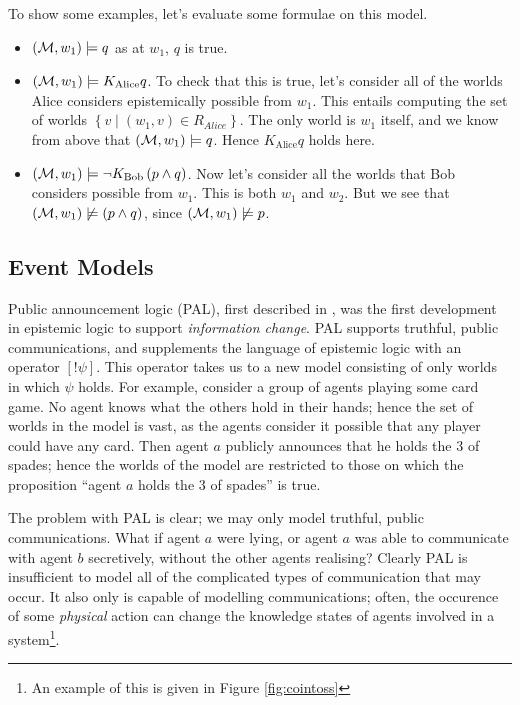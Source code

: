 \documentclass[10pt, a4paper]{report}
\begin{document}
To show some examples, let's evaluate some formulae on this model.

\begin{itemize}
\item $(\mathcal{M}, w_1) \models q$ as at $w_1$, $q$ is true.
\item $(\mathcal{M}, w_1) \models K_{\text{Alice}} q$. To check that this is true,
  let's consider all of the worlds Alice considers epistemically possible from $w_1$. This
  entails computing the set of worlds $\left\{ v \mid (w_1, v) \in R_{Alice}
  \right\}$. The only world is $w_1$ itself, and we know from above that
  $(\mathcal{M}, w_1) \models q$. Hence $K_{\text{Alice}} q$ holds here.
\item $(\mathcal{M}, w_1) \models \neg K_{\text{Bob}} \left( p \land q \right)$. Now
  let's consider all the worlds that Bob considers possible from $w_1$. This is
  both $w_1$ and $w_2$. But we see that $(\mathcal{M}, w_1) \not \models (p \land
  q)$, since $(\mathcal{M}, w_1) \not \models p$. 
\end{itemize}

\subsection{Event Models}
\label{sec:Event Models}


Public announcement logic (PAL), first described in \cite{PAL}, was the first
development in epistemic logic to support \emph{information change}. PAL
supports truthful, public communications, and supplements the language of
epistemic logic with an operator $[!\psi]$. This operator takes us to a new
model consisting of only worlds in which $\psi$ holds. For example, consider a
group of agents playing some card game. No agent knows what the others hold in
their hands; hence the set of worlds in the model is vast, as the agents
consider it possible that any player could have any card. Then agent $a$
publicly announces that he holds the 3 of spades; hence the worlds of the model
are restricted to those on which the proposition ``agent $a$ holds the 3 of
spades'' is true.

The problem with PAL is clear; we may only model truthful, public
communications. What if agent $a$ were lying, or agent $a$ was able to
communicate with agent $b$ secretively, without the other agents realising?
Clearly PAL is insufficient to model all of the complicated types of
communication that may occur. It also only is capable of modelling
communications; often, the occurence of some \emph{physical} action can change
the knowledge states of agents involved in a system\footnote{An example of this
  is given in Figure \ref{fig:cointoss}}. 
\end{document}
